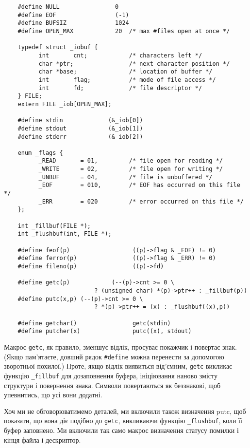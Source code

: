 \documentclass[a4paper,12pt]{book}
\begin{document}
  \begin{verbatim}
    #define NULL                0
    #define EOF                 (-1)
    #define BUFSIZ              1024
    #define OPEN_MAX            20  /* max #files open at once */

    typedef struct _iobuf {
          int       cnt;            /* characters left */
          char *ptr;                /* next character position */
          char *base;               /* location of buffer */
          int       flag;           /* mode of file access */
          int       fd;             /* file descriptor */
    } FILE;
    extern FILE _iob[OPEN_MAX];

    #define stdin             (&_iob[0])
    #define stdout            (&_iob[1])
    #define stderr            (&_iob[2])

    enum _flags {
          _READ       = 01,         /* file open for reading */
          _WRITE      = 02,         /* file open for writing */
          _UNBUF      = 04,         /* file is unbuffered */
          _EOF        = 010,        /* EOF has occurred on this file */
          _ERR        = 020         /* error occurred on this file */
    };

    int _fillbuf(FILE *);
    int _flushbuf(int, FILE *);

    #define feof(p)                  ((p)->flag & _EOF) != 0)
    #define ferror(p)                ((p)->flag & _ERR) != 0)
    #define fileno(p)                ((p)->fd)

    #define getc(p)            (--(p)->cnt >= 0 \
                          ? (unsigned char) *(p)->ptr++ : _fillbuf(p))
    #define putc(x,p) (--(p)->cnt >= 0 \
                          ? *(p)->ptr++ = (x) : _flushbuf((x),p))

    #define getchar()                getc(stdin)
    #define putcher(x)               putc((x), stdout)
  \end{verbatim}

  Макрос \texttt{getc}, як правило, зменшує відлік, просуває покажчик і повертає знак.
  (Якщо пам'ятаєте, довший рядок \texttt{\#define} можна перенести за допомогою зворотньої
  похилої.) Проте, якщо відлік виявиться від'ємним, \texttt{getc} викликає функцію
  \texttt{\_fillbuf} для дозаповнення буфера, ініціювання наново змісту структури і
  повернення знака. Символи повертаються як беззнакові, щоб упевнитись, що усі вони
  додатні.

  Хоч ми не обговорюватимемо деталей, ми включили також визначення putc, щоб показати, що
  вона діє подібно до \texttt{getc}, викликаючи функцію \texttt{\_flushbuf}, коли її буфер
  заповнено. Ми включили так само макрос визначення статусу помилки і кінця файла і
  дескриптор.
\end{document}
